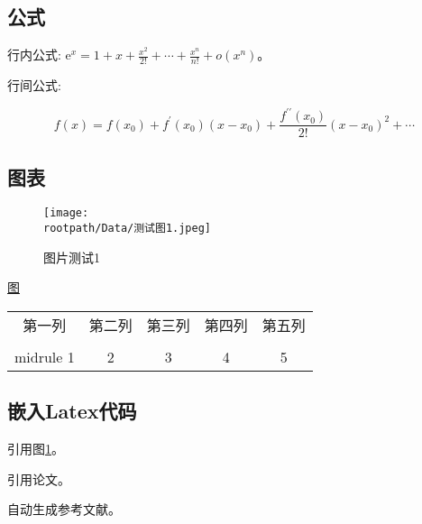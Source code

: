 \documentclass{ctexart}
\newcommand{\rootpath}{.}
\begin{document}
\subsection{公式}

行内公式: $\mathrm{e}^{x}=1+x+\frac{x^{2}}{2 !}+\cdots+\frac{x^{n}}{n !}+o\left(x^{n}\right)$。

行间公式:

\begin{equation}
  f(x)=f\left(x_{0}\right)+f^{\prime}\left(x_{0}\right)\left(x-x_{0}\right)+\frac{f^{\prime \prime}\left(x_{0}\right)}{2 !}\left(x-x_{0}\right)^{2}+\cdots
\end{equation}
\subsection{图表}

\begin{figure}[H]
    \centering
    \texttt{[image: \\rootpath/Data/测试图1.jpeg]}
    \caption{图片测试1}
    \label{图片测试1}
\end{figure}

\href{/Data/测试图2.jpg}{图}
\begin{table}[H]
    \centering
    \begin{tabular}{ccccc}
        \toprule
        第一列 & 第二列 & 第三列 & 第四列 & 第五列\\
        \\midrule
        1 & 2 & 3 & 4 & 5\\
        \bottomrule
    \end{tabular}
\end{table}
\subsection{嵌入Latex代码}

引用图\ref{图片测试1}。

引用论文\cite{lu_deepxde_2021}。

自动生成参考文献。
\newpage


\end{document}

